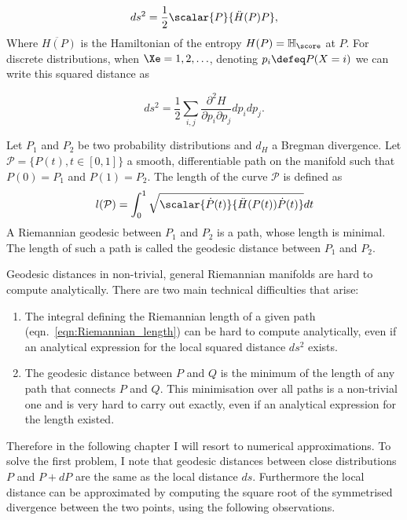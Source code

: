 \begin{equation}
	ds^2 = \frac{1}{2} \scalar{P}{\ddot{H}(P)P},
\end{equation}
Where $\ddot{H(P)}$ is the Hamiltonian of the entropy $H(P) = \mathbb{H}_{\score}$ at $P$. For discrete distributions, when $\Xe={1,2,\ldots}$, denoting $p_i\defeq P(X=i)$ we can write this squared distance as

\begin{equation}
	ds^2 = \frac{1}{2} \sum_{i,j} \frac{\partial^2 H}{\partial p_i\partial p_j} dp_{i} dp_{j}.
\end{equation}

\begin{definition}
	Let $P_1$ and $P_2$ be two probability distributions and $d_H$ a Bregman divergence. Let $\mathcal{P}=\{P(t),t\in[0,1]\}$ a smooth, differentiable path on the manifold such that $P(0)=P_1$ and $P(1)=P_2$. The length of the curve $\mathcal{P}$ is defined as
	\begin{equation}
		l(\mathcal{P}) = \int_{0}^{1} \sqrt{ \scalar{\dot{P}(t)}{\ddot{H}(P(t))\dot{P}(t)}} dt \label{eqn:Riemannian_length}
	\end{equation}
	A Riemannian geodesic between $P_1$ and $P_2$ is a path, whose length is minimal. The length of such a path is called the geodesic distance between $P_1$ and $P_2$.
\end{definition}

Geodesic distances in non-trivial, general Riemannian manifolds are hard to compute analytically. There are two main technical difficulties that arise:
\begin{enumerate}
	\item The integral defining the Riemannian length of a given path (eqn.\ \eqref{eqn:Riemannian_length}) can be hard to compute analytically, even if an analytical expression for the local squared distance $ds^2$ exists.
	\item The geodesic distance between $P$ and $Q$ is the minimum of the length of any path that connects $P$ and $Q$. This minimisation over all paths is a non-trivial one and is very hard to carry out exactly, even if an analytical expression for the length existed.
\end{enumerate}

Therefore in the following chapter I will resort to numerical approximations. To solve the first problem, I note that geodesic distances between close distributions $P$ and $P+dP$ are the same as the local distance $ds$. Furthermore the local distance can be approximated by computing the square root of the symmetrised divergence between the two points, using the following observations.

